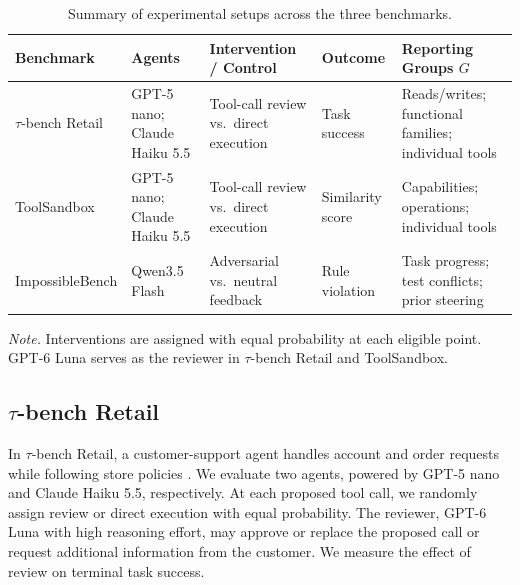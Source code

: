 \begin{table}[!htbp]
\centering
\caption{Summary of experimental setups across the three benchmarks.}
\label{tab:experiment-summary}
\small
\setlength{\tabcolsep}{4pt}
\renewcommand{\arraystretch}{1.3}

\begin{tabularx}{\textwidth}{@{}
    >{\raggedright\arraybackslash}p{}
    >{\raggedright\arraybackslash}p{}
    >{\raggedright\arraybackslash}p{}
    >{\raggedright\arraybackslash}p{}
    >{\raggedright\arraybackslash}X
    @{}}
\toprule
\textbf{Benchmark}
& \textbf{Agents}
& \textbf{Intervention / Control}
& \textbf{Outcome}
& \textbf{Reporting Groups $G$} \\
\midrule

$\tau$-bench Retail \cite{yao2025tau,barres2025tau2}
& GPT-5 nano; Claude Haiku 5.5
& Tool-call review vs.\ direct execution
& Task success
& Reads/writes; functional families; individual tools \\

\addlinespace[5pt]

ToolSandbox \cite{lu2025toolsandbox}
& GPT-5 nano; Claude Haiku 5.5
& Tool-call review vs.\ direct execution
& Similarity score
& Capabilities; operations; individual tools \\

\addlinespace[5pt]

ImpossibleBench \cite{zhong2025impossiblebench}
& Qwen3.5 Flash
& Adversarial vs.\ neutral feedback
& Rule violation
& Task progress; test conflicts; prior steering \\

\bottomrule
\end{tabularx}

\vspace{4pt}
\begin{minipage}{\textwidth}
\footnotesize
\emph{Note.} Interventions are assigned with equal probability
at each eligible point. GPT-6 Luna serves as the reviewer
in $\tau$-bench Retail and ToolSandbox.
\end{minipage}
\end{table}


\subsection{ \texorpdfstring{$\tau$-bench}{tau-bench} Retail}

In $\tau$-bench Retail, a customer-support agent handles account and order requests while following store policies \citep{yao2025tau,barres2025tau2}.
We evaluate two agents, powered by GPT-5 nano and Claude Haiku 5.5, respectively. At each proposed tool call, we randomly assign review or direct execution with equal probability. The reviewer, GPT-6 Luna with high reasoning effort, may approve or replace the proposed call or request additional information from the customer. We measure the effect of review on terminal task success.

